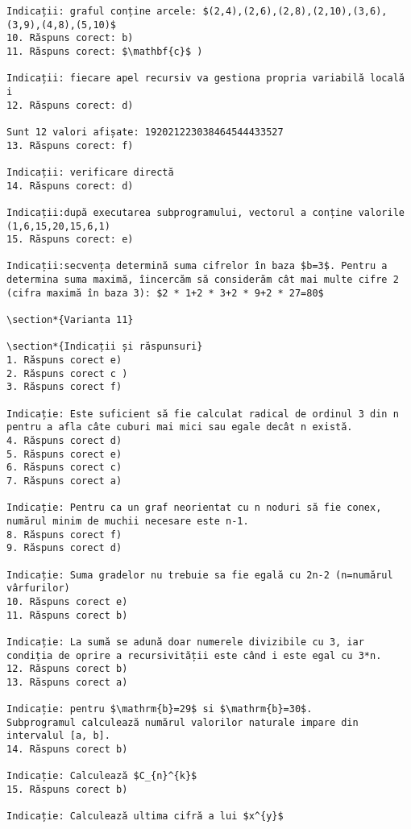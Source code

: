 \begin{verbatim}
Indicații: graful conține arcele: $(2,4),(2,6),(2,8),(2,10),(3,6),(3,9),(4,8),(5,10)$
10. Răspuns corect: b)
11. Răspuns corect: $\mathbf{c}$ )

Indicații: fiecare apel recursiv va gestiona propria variabilă locală i
12. Răspuns corect: d)

Sunt 12 valori afișate: 192021223038464544433527
13. Răspuns corect: f)

Indicații: verificare directă
14. Răspuns corect: d)

Indicații:după executarea subprogramului, vectorul a conține valorile (1,6,15,20,15,6,1)
15. Răspuns corect: e)

Indicații:secvența determină suma cifrelor în baza $b=3$. Pentru a determina suma maximă, îincercăm să considerăm cât mai multe cifre 2 (cifra maximă în baza 3): $2 * 1+2 * 3+2 * 9+2 * 27=80$

\section*{Varianta 11}

\section*{Indicații și răspunsuri}
1. Răspuns corect e)
2. Răspuns corect c )
3. Răspuns corect f)

Indicație: Este suficient să fie calculat radical de ordinul 3 din n pentru a afla câte cuburi mai mici sau egale decât n există.
4. Răspuns corect d)
5. Răspuns corect e)
6. Răspuns corect c)
7. Răspuns corect a)

Indicație: Pentru ca un graf neorientat cu n noduri să fie conex, numărul minim de muchii necesare este n-1.
8. Răspuns corect f)
9. Răspuns corect d)

Indicație: Suma gradelor nu trebuie sa fie egală cu 2n-2 (n=numărul vârfurilor)
10. Răspuns corect e)
11. Răspuns corect b)

Indicație: La sumă se adună doar numerele divizibile cu 3, iar condiția de oprire a recursivității este când i este egal cu 3*n.
12. Răspuns corect b)
13. Răspuns corect a)

Indicație: pentru $\mathrm{b}=29$ si $\mathrm{b}=30$.
Subprogramul calculează numărul valorilor naturale impare din intervalul [a, b].
14. Răspuns corect b)

Indicație: Calculează $C_{n}^{k}$
15. Răspuns corect b)

Indicație: Calculează ultima cifră a lui $x^{y}$


\end{verbatim}
